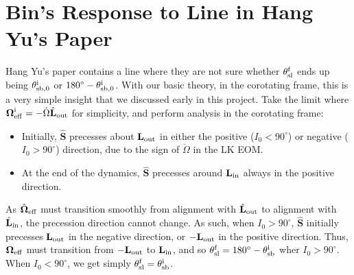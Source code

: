\documentclass[11pt,
        usenames, %
        dvipsnames %
    ]{article}
\newcommand*{\bm}[1]{\boldsymbol{\mathbf{#1}}}
\newcommand*{\uv}[1]{\hat{\bm{#1}}}
\begin{document}
\section{Bin's Response to Line in Hang Yu's Paper}

Hang Yu's paper contains a line where they are not sure whether $\theta_{\rm
sl}^{\rm f}$ ends up being $\theta_{\rm sb, 0}^{\rm i}$ or $180^\circ -
\theta_{\rm sb, 0}^{\rm i}$. With our basic theory, in the corotating
frame, this is a very simple insight that we discussed early in this project.
Take the limit where $\bm{\Omega}_{\rm eff}^{\rm i} = -\dot{\Omega}\uv{L}_{\rm
out}$ for simplicity, and perform analysis in the corotating frame:
\begin{itemize}
    \item Initially, $\uv{S}$ precesses about $\bm{L}_{\rm out}$ in either the
        positive ($I_0 < 90^\circ$) or negative ($I_0 > 90^\circ$) direction,
        due to the sign of $\dot{\Omega}$ in the LK EOM\@.

    \item At the end of the dynamics, $\uv{S}$ precesses around $\bm{L}_{\rm
        in}$ always in the positive direction.
\end{itemize}
As $\uv{\Omega}_{\rm eff}$ must transition smoothly from alignment with
$\uv{L}_{\rm out}$ to alignment with $\uv{L}_{\rm in}$, the precession direction
cannot change. As such, when $I_0 > 90^\circ$, $\uv{S}$ initially precesses
$\bm{L}_{\rm out}$ in the negative direction, or $-\bm{L}_{\rm out}$ in the
positive direction. Thus, $\bm{\Omega}_{\rm eff}$ must transition from
$-\bm{L}_{\rm out}$ to $\bm{L}_{\rm in}$, and so $\theta_{\rm sl}^{\rm f} =
180^\circ - \theta_{\rm sb}^{\rm i}$ wher $I_0 > 90^\circ$. When $I_0 <
90^\circ$, we get simply $\theta_{\rm sl}^{\rm f} = \theta_{\rm sb}^{\rm i}$.
\end{document}
